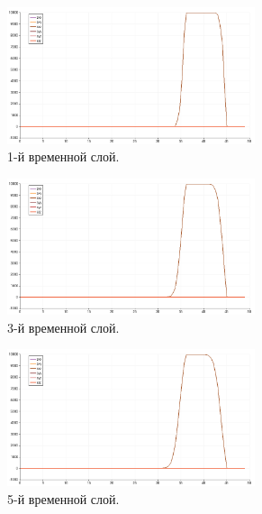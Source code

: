\begin{figure}[htp]
\begin{subfigure}[b]{0.5\textwidth}
\centering
\includegraphics[width=0.8\textwidth]{png/s-wave-test/s/0001.png}
\caption{1-й временной слой.}
\end{subfigure}
\begin{subfigure}[b]{0.5\textwidth}
\centering
\includegraphics[width=0.8\textwidth]{png/s-wave-test/s/0003.png}
\caption{3-й временной слой.}
\end{subfigure}
\begin{subfigure}[b]{0.5\textwidth}
\centering
\includegraphics[width=0.8\textwidth]{png/s-wave-test/s/0005.png}
\caption{5-й временной слой.}
\end{subfigure}
\begin{subfigure}[b]{0.5\textwidth}
\centering

\end{subfigure}
\end{figure}
